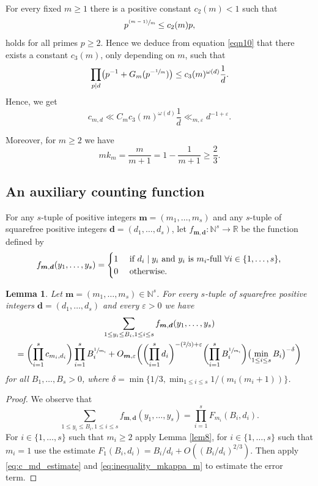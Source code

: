 \documentclass[JEP,XML,SOM,Unicode,published]{cedram}
\newcommand{\Psfrac}[2]{(\sfrac{#1}{#2})}
\newcommand{\psfrac}[2]{\sfrac{(#1)}{#2}}
\let\ome\omega
\newcommand{\bfm}{{\boldsymbol{m}}}
\newcommand{\bfd}{\boldsymbol{d}}
\newcommand\NN{\mathbb{N}}
\newcommand\RR{\mathbb{R}}
\newtheorem{lemma}[theorem]{Lemma}
\theoremstyle{definition}
\numberwithin{theorem}{section}
\begin{document}
For every fixed $m\geq 1$ there is a positive constant $c_2(m)<1$ such that
\[
p^{\psfrac{m-1}{m}}\leq c_2(m) p,
\]
holds for all primes $p\geq 2$. Hence we deduce from equation \eqref{eqn10}
that there exists a constant $c_3(m)$, only depending on $m$, such that
\begin{equation}\label{eqn11}
\prod_{p\mid d} \bigl(p^{-1}+G_{m}(p^{-\sfrac{1}{m}})\bigr)
\leq c_3(m)^{\ome(d)}\frac{1}{d}.
\end{equation}
Hence, we get
\begin{equation}
\label{eq:c_md_estimate}
c_{m,d}
\ll C_m c_3(m)^{\ome(d)}\frac{1}{d}
\ll_{m,\varepsilon}d^{-1+\varepsilon}.
\end{equation}

Moreover, for $m\geq 2$ we have
\begin{equation}
\label{eq:inequality_mkappa_m}
m k_m=\frac m{m+1}=1-\frac 1{m+1}\geq \frac 23.
\end{equation}

\subsection{An auxiliary counting function}
\label{sec:counting_function_f}
For any $s$-tuple of positive integers $\bfm=(m_1,\dots,m_s)$ and any $s$-tuple of squarefree positive integers $\bfd=(d_1,\dots,d_s)$,
let $f_{\bfm, \bfd} : \NN^s \to \RR$ be the function defined by
\[
f_{\bfm, \bfd}(y_1,\dots,y_s)=\begin{cases}
1 & \text{ if $d_i\mid y_i$ and $y_i$ is $m_i$-full $ \forall i\in\{1,\dots,s\}$,}\\
0 & \text{ otherwise.}
\end{cases}
\]
\begin{lemma}
\label{lem:counting_function_f}
Let $\bfm=(m_1,\dots,m_s)\in\NN^s$. For every $s$-tuple of squarefree positive integers $\bfd=(d_1,\dots,d_s)$ and every $\varepsilon>0$ we have
\begin{multline*}
\sum_{1\leq y_i\leq B_i, 1\leq i\leq s} f_{\bfm, \bfd}(y_1,\dots,y_s) \\
=\biggl(\prod_{i=1}^s c_{m_i,d_i}\biggr)\prod_{i=1}^s B_i^{\sfrac1{m_i} }
+O_{\bfm, \varepsilon}\biggl(\biggl(\prod_{i=1}^sd_i\biggr)^{-\Psfrac23+\varepsilon}\biggl(\prod_{i=1}^s B_i^{\sfrac1{m_i}}\biggr)\bigl(\min_{1\leq i\leq s} B_i\bigr)^{-\delta}\biggr)
\end{multline*}
for all $B_1,\dots,B_s>0$,
where $\delta=\min \{ 1/3 , \min_{1\leq i\leq s}1/(m_i(m_i+1)) \}$.
\end{lemma}
\begin{proof}
We observe that
\[
\sum_{1\leq y_i\leq B_i, 1\leq i\leq s} f_{\bfm, \bfd}(y_1,\dots,y_s) = \prod_{i=1}^s F_{m_i}(B_i,d_i).
\]
For $i\in\{1,\dots,s\}$ such that $m_i\geq 2$ apply Lemma \ref{lem8}, for $i\in\{1,\dots, s\}$ such that $m_i=1$ use the estimate $F_1(B_i,d_i)= B_i/d_i + O((B_i/d_i)^{2/3})$.
Then apply \eqref{eq:c_md_estimate} and \eqref{eq:inequality_mkappa_m} to estimate the error term.
\end{proof}
\end{document}
